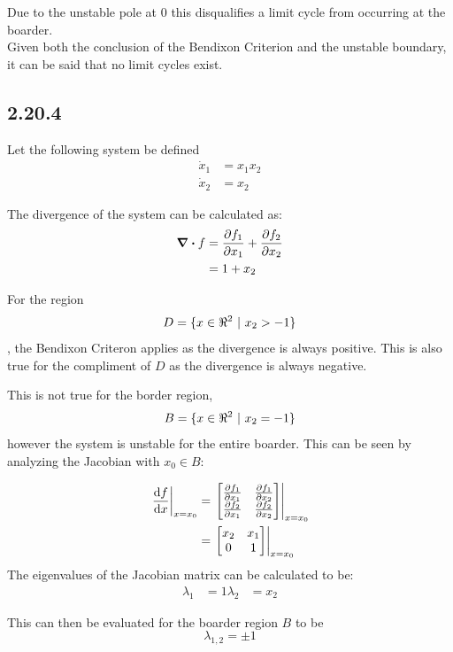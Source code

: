 \documentclass[letter]{article}
\begin{document}
Due to the unstable pole at $0$ this disqualifies a limit cycle from occurring at the boarder.\\

Given both the conclusion of the Bendixon Criterion and the unstable boundary, it can be said that no limit cycles exist.


\newpage
\subsection{2.20.4}
Let the following system be defined
\begin{equation}
	\begin{aligned}
		\dot{x}_1 &= x_1 x_2\\
		\dot{x}_2 &= x_2
	\end{aligned}
\end{equation}

The divergence of the system can be calculated as:
\begin{align}
	\div f  &= \pdv{f_1}{x_1} + \pdv{f_2}{x_2} \nonumber\\
	&= 1 + x_2
\end{align}

For the region $$D = \{x\in \real^2 \ | \ x_2 > -1\}$$, the Bendixon Criteron applies as the divergence is always positive. This is also true for the compliment of $D$ as the divergence is always negative.

This is not true for the border region,
\begin{equation}
	B = \{x \in \real^2 \ | \ x_2 = -1\}
\end{equation}
however the system is unstable for the entire boarder. This can be seen by analyzing the Jacobian with $x_0 \in B$:

\begin{align}
	\eval{\dv{f}{x}}_{x=x_0} 
	&= \eval{\mqty[\pdv{f_1}{x_1} & \pdv{f_1}{x_2}\\
		\pdv{f_2}{x_1} & \pdv{f_2}{x_2}]}_{x=x_0}\\
	&= \eval{\mqty[x_2 & x_1\\ 0 &1]}_{x=x_0}
\end{align}
The eigenvalues of the Jacobian matrix can be calculated to be:
\begin{equation}
	\begin{aligned}
		\lambda_1 &= 1
		\lambda_2 &= x_2
	\end{aligned}
\end{equation}

This can then be evaluated for the boarder region $B$ to be
\begin{equation}
	\lambda_{1,2} = \pm 1
\end{equation}
\end{document}
